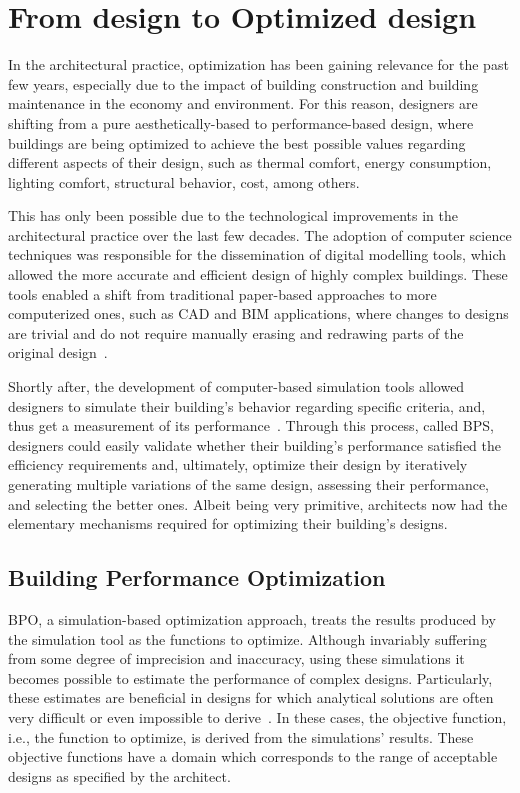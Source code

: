 \section{From design to Optimized design}

	In the architectural practice, optimization has been gaining relevance for the past few years, especially due to the impact of building construction and building maintenance in the economy and environment. For this reason, designers are shifting from a pure aesthetically-based to performance-based design, where buildings are being optimized to achieve the best possible values regarding different aspects of their design, such as thermal comfort, energy consumption, lighting comfort, structural behavior, cost, among others.

	This has only been possible due to the technological improvements in the architectural practice over the last few decades. The adoption of computer science techniques was responsible for the dissemination of digital modelling tools, which allowed the more accurate and efficient design of highly complex buildings. These tools enabled a shift from traditional paper-based approaches to more
computerized ones, such as \ac{CAD} and \ac{BIM} applications, where changes to designs are trivial and do not require manually erasing and redrawing parts of the original design~\cite{Ferreira2015GD}.

	Shortly after, the development of computer-based simulation tools allowed designers to simulate their building's behavior regarding specific criteria, and, thus get a measurement of its performance~\cite{Malkawi2005}. Through this process, called \ac{BPS}, designers could easily validate whether their building's performance satisfied the efficiency requirements and, ultimately, optimize their design by iteratively generating multiple variations of the same design, assessing their performance, and selecting the better ones. Albeit being very primitive, architects now had the elementary mechanisms required for optimizing their building's designs.

\subsection{Building Performance Optimization}

	\ac{BPO}, a simulation-based optimization approach, treats the results produced by the simulation tool as the functions to optimize. Although invariably suffering from some degree of imprecision and inaccuracy, using these simulations it becomes possible to estimate the performance of complex designs. Particularly, these estimates are beneficial in designs for which analytical solutions are often very difficult or even impossible to derive~\cite{Kolda2003}. In these cases, the objective function, i.e., the function to optimize, is derived from the simulations' results. These objective functions have a domain which corresponds to the range of acceptable designs as specified by the architect.


